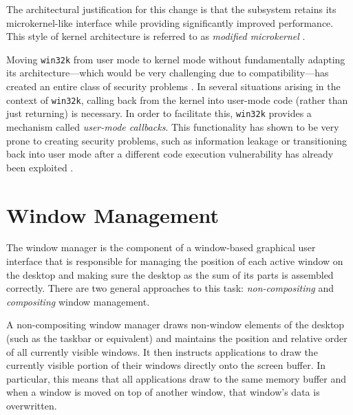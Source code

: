 			The architectural justification for this change is that the
			subsystem retains its microkernel-like interface while providing
			significantly improved performance. This style of kernel
			architecture is referred to as \emph{modified microkernel}
			\cite{gdikernel}.

			Moving \texttt{win32k} from user mode to kernel mode without
			fundamentally adapting its architecture---which would be very
			challenging due to compatibility---has created an entire class of
			security problems \cite{mandy2011kernel}.  In several situations arising in the context of
			\texttt{win32k}, calling back from the kernel into user-mode code
			(rather than just returning) is necessary. In order to facilitate
			this, \texttt{win32k} provides a mechanism called \textit{user-mode
			callbacks}. This functionality has shown to be very prone to
			creating security problems, such as information leakage or
			transitioning back into user mode after a different code execution
			vulnerability has already been exploited \cite{mandy2011kernel}.

	\section{Window Management}\label{sec:wm}
			The window manager is the component of a window-based graphical user
			interface that is responsible for managing the position of each active
			window on the desktop and making sure the desktop as the sum of its
			parts is assembled correctly. There are two general approaches to this
			task: \emph{non-compositing} and \emph{compositing} window management.

			A non-compositing window manager draws non-window elements of the
			desktop (such as the taskbar or equivalent) and maintains the
			position and relative order of all currently visible windows. It
			then instructs applications to draw the currently visible portion
			of their windows directly onto the screen buffer. In particular,
			this means that all applications draw to the same memory buffer and
			when a window is moved on top of another window, that window's data
			is overwritten.

